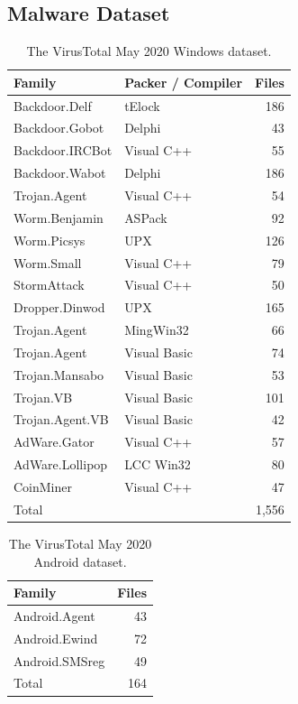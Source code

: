\documentclass[conference]{IEEEtran}
\begin{document}
\subsection{Malware Dataset}
\label{sec_Malware_Dataset}

\begin{table}[t]
	\caption{The VirusTotal May 2020 Windows dataset.}
	\label{tab_labeling_windows}
	\centering
	\begin{tabular}{llr}
		\toprule
		Family & Packer / Compiler & Files\\
		\midrule
		Backdoor.Delf    & tElock       & 186\\
		Backdoor.Gobot   & Delphi       & 43 \\
		Backdoor.IRCBot  & Visual C++   & 55\\
		Backdoor.Wabot   & Delphi       & 186\\
		Trojan.Agent     & Visual C++   & 54\\
		Worm.Benjamin    & ASPack       & 92\\
		Worm.Picsys      & UPX          & 126\\
		Worm.Small       & Visual C++   & 79\\
		StormAttack      & Visual C++   & 50\\
		Dropper.Dinwod   & UPX          & 165\\
		Trojan.Agent     & MingWin32    & 66\\
		Trojan.Agent     & Visual Basic & 74 \\
		Trojan.Mansabo   & Visual Basic & 53\\
		Trojan.VB        & Visual Basic & 101\\
		Trojan.Agent.VB  & Visual Basic & 42\\
		AdWare.Gator     & Visual C++   & 57\\
		AdWare.Lollipop  & LCC Win32    & 80\\
		CoinMiner        & Visual C++   & 47\\
		\midrule
		Total & & 1,556\\
		\bottomrule
	\end{tabular}
\end{table}

\begin{table}[t]
	\caption{The VirusTotal May 2020 Android dataset.}
	\label{tab_labeling_android}
	\centering
	\begin{tabular}{lr}
		\toprule
		Family & Files\\
		\midrule
		Android.Agent    & 43\\
		Android.Ewind    & 72\\
		Android.SMSreg   & 49\\
		\midrule
		Total & 164\\
		\bottomrule
	\end{tabular}
\end{table}
\end{document}
